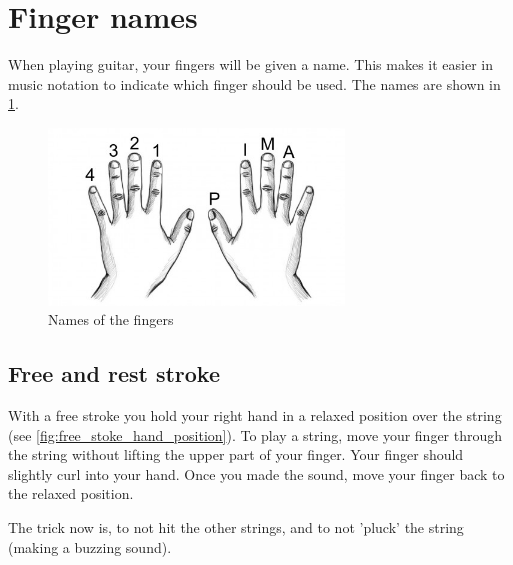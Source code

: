 \section{Finger names}

When playing guitar, your fingers will be given a name. This makes it easier in music notation to indicate which finger should be used. The names are shown in \ref{fig:finger_names}.

\begin{figure}[h]
    \centering
    \includegraphics[width=0.7\textwidth]{../Images/guitar-finger-tips_pima.jpg}
    \caption{Names of the fingers \cite{FingerNames}}
    \label{fig:finger_names}
\end{figure}

\subsection{Free and rest stroke}

With a free stroke you hold your right hand in a relaxed position over the string (see \ref{fig:free_stoke_hand_position}). To play a string, move your finger through the string without lifting the upper part of your finger. Your finger should slightly curl into your hand. Once you made the sound, move your finger back to the relaxed position.

The trick now is, to not hit the other strings, and to not 'pluck' the string (making a buzzing sound).

